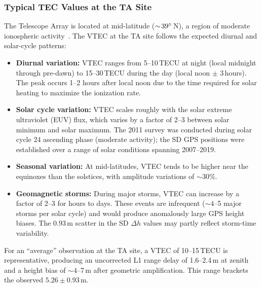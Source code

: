 \subsubsection{Typical TEC Values at the TA Site}

The Telescope Array is located at mid-latitude ($\sim\!39^\circ$\,N), a region of moderate ionospheric activity~\cite{mannucci1998}. The VTEC at the TA site follows the expected diurnal and solar-cycle patterns:

\begin{itemize}[nosep]
\item \textbf{Diurnal variation:} VTEC ranges from 5--10\,TECU at night (local midnight through pre-dawn) to 15--30\,TECU during the day (local noon $\pm$ 3\,hours). The peak occurs 1--2 hours after local noon due to the time required for solar heating to maximize the ionization rate.

\item \textbf{Solar cycle variation:} VTEC scales roughly with the solar extreme ultraviolet (EUV) flux, which varies by a factor of 2--3 between solar minimum and solar maximum. The 2011 survey was conducted during solar cycle 24 ascending phase (moderate activity); the SD GPS positions were established over a range of solar conditions spanning 2007--2019.

\item \textbf{Seasonal variation:} At mid-latitudes, VTEC tends to be higher near the equinoxes than the solstices, with amplitude variations of $\sim\!30$\%.

\item \textbf{Geomagnetic storms:} During major storms, VTEC can increase by a factor of 2--3 for hours to days. These events are infrequent ($\sim\!4$--5 major storms per solar cycle) and would produce anomalously large GPS height biases. The $0.93$\,m scatter in the SD $\Delta h$ values may partly reflect storm-time variability.
\end{itemize}

For an ``average'' observation at the TA site, a VTEC of 10--15\,TECU is representative, producing an uncorrected L1 range delay of 1.6--2.4\,m at zenith and a height bias of $\sim\!4$--7\,m after geometric amplification. This range brackets the observed $5.26 \pm 0.93$\,m.



